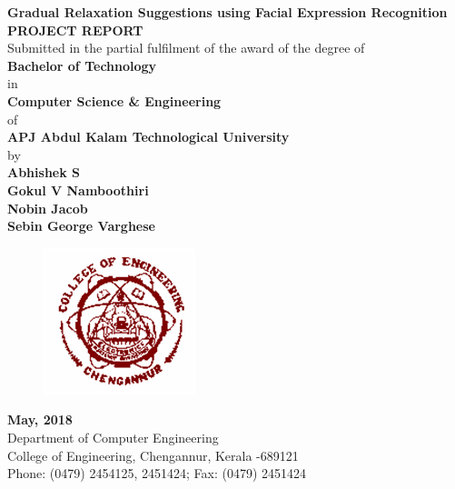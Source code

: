 \documentclass[a4paper,12pt,oneside]{article}
\begin{document}
\thispagestyle{empty}
\begin{center}
\vspace*{4mm}
\large{\textbf{Gradual Relaxation Suggestions using Facial Expression Recognition}
\setlength{\baselineskip}{1.5\baselineskip}}
\\

\vspace{5mm}
\textbf{PROJECT REPORT}
\\
\vspace{3mm}
Submitted in the partial fulfilment of the award of the degree
of
\vspace{3mm}
\\
\textbf{Bachelor of Technology}
\\
\vspace{3mm}
in
\\
\vspace{3mm}
\textbf{Computer Science \& Engineering}
\\
\vspace{3mm}
of
\\
\vspace{3mm}
\textbf{APJ Abdul Kalam Technological University}
\\
\vspace{3mm}
by
\\
\vspace{3mm}
\textbf{Abhishek S}
\\
\textbf{Gokul V Namboothiri}
\\
\textbf{Nobin Jacob}
\\
\textbf{Sebin George Varghese}
\\
\vspace{5mm}

\begin{figure}[H]
	\centering
	\includegraphics{ceclogo.png}
\end{figure}

\vspace{21mm}
\textbf{May, 2018}
\vspace{8mm}
\\
\vspace{2mm}
Department of Computer Engineering
\\
\vspace{2mm}
College of Engineering, Chengannur, Kerala -689121
\\
\vspace{2mm}
Phone: (0479) 2454125, 2451424; Fax: (0479) 2451424
\\
\end{center}
\end{document}
